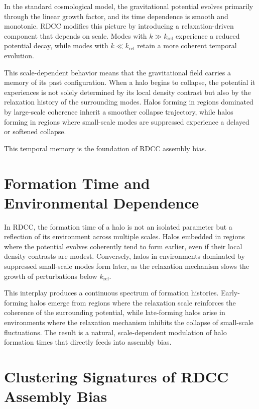 \documentclass[11pt,a4paper]{article}
\begin{document}
In the standard cosmological model, the gravitational potential evolves primarily 
through the linear growth factor, and its time dependence is smooth and monotonic. 
RDCC modifies this picture by introducing a relaxation-driven component that depends 
on scale. Modes with $k \gg k_{\mathrm{rel}}$ experience a reduced potential decay, 
while modes with $k \ll k_{\mathrm{rel}}$ retain a more coherent temporal evolution.

This scale-dependent behavior means that the gravitational field carries a memory of 
its past configuration. When a halo begins to collapse, the potential it experiences 
is not solely determined by its local density contrast but also by the relaxation 
history of the surrounding modes. Halos forming in regions dominated by large-scale 
coherence inherit a smoother collapse trajectory, while halos forming in regions where 
small-scale modes are suppressed experience a delayed or softened collapse.

This temporal memory is the foundation of RDCC assembly bias.
\section{Formation Time and Environmental Dependence}

In RDCC, the formation time of a halo is not an isolated parameter but a reflection of 
its environment across multiple scales. Halos embedded in regions where the potential 
evolves coherently tend to form earlier, even if their local density contrasts are 
modest. Conversely, halos in environments dominated by suppressed small-scale modes 
form later, as the relaxation mechanism slows the growth of perturbations below 
$k_{\mathrm{rel}}$.

This interplay produces a continuous spectrum of formation histories. Early-forming 
halos emerge from regions where the relaxation scale reinforces the coherence of the 
surrounding potential, while late-forming halos arise in environments where the 
relaxation mechanism inhibits the collapse of small-scale fluctuations. The result is 
a natural, scale-dependent modulation of halo formation times that directly feeds into 
assembly bias.
\section{Clustering Signatures of RDCC Assembly Bias}
\end{document}
